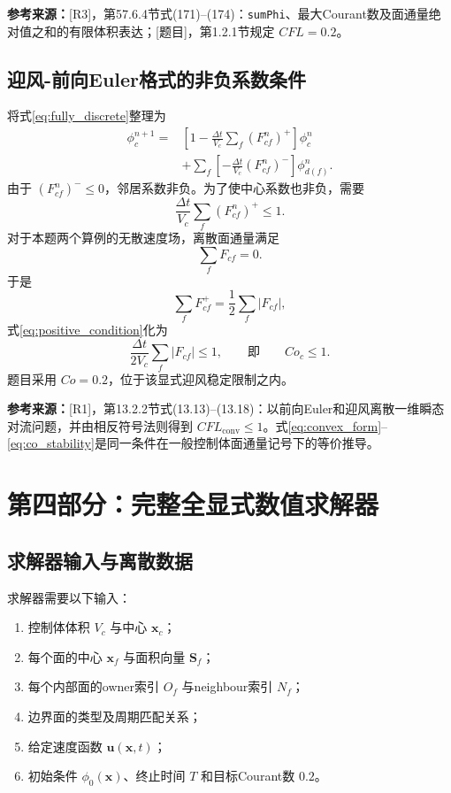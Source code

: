 \documentclass[UTF8,12pt,a4paper]{ctexart}
\numberwithin{equation}{section}
\newcommand{\Rone}{\textnormal{[R1]}}
\newcommand{\Rthree}{\textnormal{[R3]}}
\newcommand{\Task}{\textnormal{[题目]}}
\newcommand{\source}[1]{%
  \par\smallskip
  \noindent\colorbox{sourcebg}{%
    \parbox{0.955\linewidth}{\footnotesize\color{sourcegray}\textbf{参考来源：}#1}%
  }
  \par\smallskip
}
\begin{document}
\source{\Rthree，第57.6.4节式(171)--(174)：\texttt{sumPhi}、最大Courant数及面通量绝对值之和的有限体积表达；\Task，第1.2.1节规定 $CFL=0.2$。}

\subsection{迎风-前向Euler格式的非负系数条件}

将式\eqref{eq:fully_discrete}整理为
\begin{align}
  \phi_c^{n+1}
  =&\left[
    1-\frac{\Delta t}{V_c}
    \sum_f(F_{cf}^n)^+
  \right]\phi_c^n
  \nonumber\\
  &+\sum_f\left[
    -\frac{\Delta t}{V_c}(F_{cf}^n)^-
  \right]\phi_{d(f)}^n.
  \label{eq:convex_form}
\end{align}
由于 $(F_{cf}^n)^-\le0$，邻居系数非负。为了使中心系数也非负，需要
\begin{equation}
  \frac{\Delta t}{V_c}\sum_f(F_{cf}^n)^+\le1.
  \label{eq:positive_condition}
\end{equation}
对于本题两个算例的无散速度场，离散面通量满足
\begin{equation}
  \sum_fF_{cf}=0.
  \label{eq:discrete_div_free}
\end{equation}
于是
\begin{equation}
  \sum_fF_{cf}^+
  =\frac12\sum_f|F_{cf}|,
  \label{eq:positive_half_abs}
\end{equation}
式\eqref{eq:positive_condition}化为
\begin{equation}
  \frac{\Delta t}{2V_c}\sum_f|F_{cf}|\le1,
  \qquad\text{即}\qquad Co_c\le1.
  \label{eq:co_stability}
\end{equation}
题目采用 $Co=0.2$，位于该显式迎风稳定限制之内。

\source{\Rone，第13.2.2节式(13.13)--(13.18)：以前向Euler和迎风离散一维瞬态对流问题，并由相反符号法则得到 $CFL_{\mathrm{conv}}\le1$。式\eqref{eq:convex_form}--\eqref{eq:co_stability}是同一条件在一般控制体面通量记号下的等价推导。}

\newpage
\section{第四部分：完整全显式数值求解器}

\subsection{求解器输入与离散数据}

求解器需要以下输入：
\begin{enumerate}
  \item 控制体体积 $V_c$ 与中心 $\bm x_c$；
  \item 每个面的中心 $\bm x_f$ 与面积向量 $\bm S_f$；
  \item 每个内部面的owner索引 $O_f$ 与neighbour索引 $N_f$；
  \item 边界面的类型及周期匹配关系；
  \item 给定速度函数 $\bm u(\bm x,t)$；
  \item 初始条件 $\phi_0(\bm x)$、终止时间 $T$ 和目标Courant数 $0.2$。
\end{enumerate}
\end{document}
